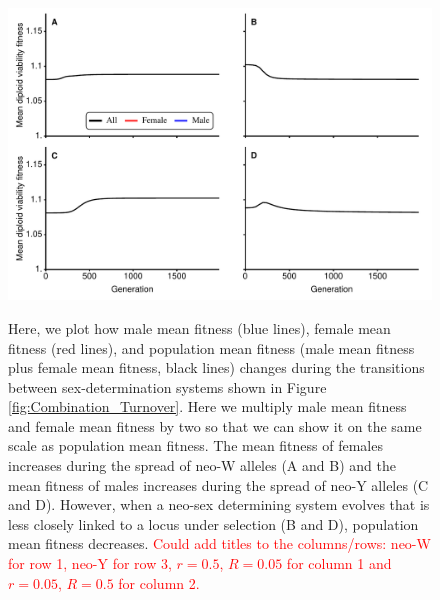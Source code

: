 \documentclass[12pt]{article}
\begin{document}
\begin{figure}[!h]
\centering
\includegraphics[width=\linewidth]{Combination_MeanFit}\\
\caption{
Here, we plot how male mean fitness (blue lines), female mean fitness (red lines), and population mean fitness (male mean fitness plus female mean fitness, black lines) changes during the transitions between sex-determination systems shown in Figure \ref{fig:Combination_Turnover}. 
Here we multiply male mean fitness and female mean fitness by two so that we can show it on the same scale as population mean fitness. 
The mean fitness of females increases during the spread of neo-W alleles (A and B) and the mean fitness of males increases during the spread of neo-Y alleles (C and D). 
However, when a neo-sex determining system evolves that is less closely linked to a locus under selection (B and D), population mean fitness decreases. 
\textcolor{red}{
Could add titles to the columns/rows: neo-W for row 1, neo-Y for row 3, $r=0.5$, $R=0.05$ for column 1 and $r=0.05$, $R=0.5$ for column 2. 
}
}
\label{fig:Combination_MeanFit}
\end{figure}
\newpage
\end{document}
